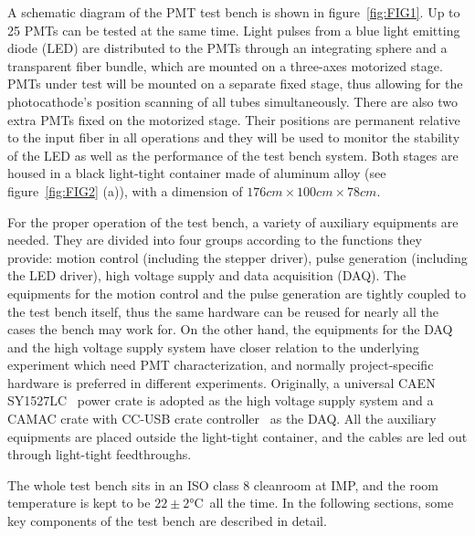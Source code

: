 \documentclass{JINST}
\begin{document}
A schematic diagram of the PMT test bench is shown in figure~\ref{fig:FIG1}.
Up to 25 PMTs can be tested at the same time.
Light pulses from a blue light emitting diode (LED) are distributed to the PMTs through an integrating sphere and a transparent fiber bundle, which are mounted on a three-axes motorized stage.
PMTs under test will be mounted on a separate fixed stage, thus allowing for the photocathode's position scanning of all tubes simultaneously.
There are also two extra PMTs fixed on the motorized stage.
Their positions are permanent relative to the input fiber in all operations and they will be used to monitor the stability of the LED as well as the performance of the test bench system.
Both stages are housed in a black light-tight container made of aluminum alloy (see figure~\ref{fig:FIG2} (a)), with a dimension of $176cm\times100cm\times78cm$.

For the proper operation of the test bench, a variety of auxiliary equipments are needed. 
They are divided into four groups according to the functions they provide: motion control (including the stepper driver), pulse generation (including the LED driver), high voltage supply and data acquisition (DAQ).
The equipments for the motion control and the pulse generation are tightly coupled to the test bench itself, thus the same hardware can be reused for nearly all the cases the bench may work for.
On the other hand, the equipments for the DAQ and the high voltage supply system have closer relation to the underlying experiment which need PMT characterization, and normally project-specific hardware is preferred in different experiments.
Originally, a universal CAEN SY1527LC~\cite{sy1527lc} power crate is adopted as the high voltage supply system and a CAMAC crate with CC-USB crate controller~\cite{cc_usb} as the DAQ.
All the auxiliary equipments are placed outside the light-tight container, and the cables are led out through light-tight feedthroughs.
	
The whole test bench sits in an ISO class 8 cleanroom at IMP, and the room temperature is kept to be $22\pm2$\si{\celsius}~all the time. 
In the following sections, some key components of the test bench are described in detail.
	
\end{document}
